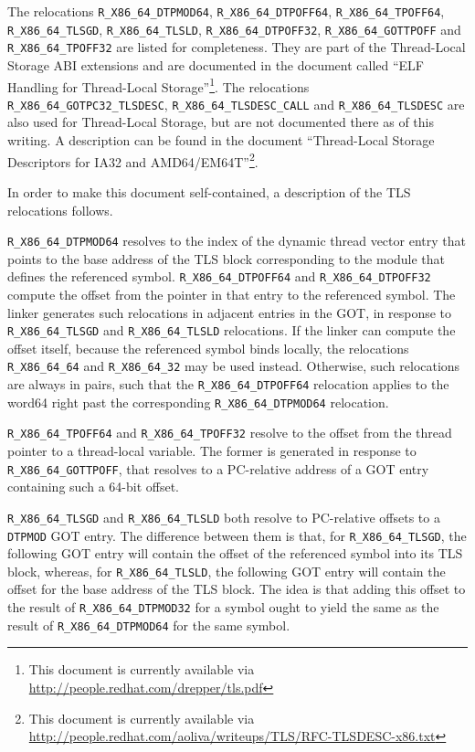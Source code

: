 \begin{sloppypar}
The relocations \texttt{R_X86_64_DTPMOD64},
\texttt{R_X86_64_DTPOFF64}, \texttt{R_X86_64_TPOFF64},
\texttt{R_X86_64_TLSGD}, \texttt{R_X86_64_TLSLD},
\texttt{R_X86_64_DTPOFF32}, \texttt{R_X86_64_GOTTPOFF} and
\texttt{R_X86_64_TPOFF32} are listed for completeness.  They are part
of the Thread-Local Storage ABI extensions and are documented in the
document called ``ELF Handling for Thread-Local
Storage''\footnote{This document is currently available via
  \url{http://people.redhat.com/drepper/tls.pdf}}.  The relocations \texttt{R_X86_64_GOTPC32_TLSDESC},
\texttt{R_X86_64_TLSDESC_CALL} and \texttt{R_X86_64_TLSDESC} are also
used for Thread-Local Storage, but are not documented there as of this
writing.  A description can be found in the document ``Thread-Local
Storage Descriptors for IA32 and AMD64/EM64T''\footnote{This document
  is currently available via
  \url{http://people.redhat.com/aoliva/writeups/TLS/RFC-TLSDESC-x86.txt}}.
\end{sloppypar}

In order to make this document self-contained, a description of the
TLS relocations follows.

\begin{sloppypar}
\texttt{R_X86_64_DTPMOD64} resolves to the index of the dynamic thread
vector entry that points to the base address of the TLS block
corresponding to the module that defines the referenced symbol.
\texttt{R_X86_64_DTPOFF64} and \texttt{R_X86_64_DTPOFF32} compute the
offset from the pointer in that entry to the referenced symbol.  The
linker generates such relocations in adjacent entries in the GOT, in
response to \texttt{R_X86_64_TLSGD} and \texttt{R_X86_64_TLSLD}
relocations.  If the linker can compute the offset itself, because the
referenced symbol binds locally, the relocations \texttt{R_X86_64_64} and \texttt{R_X86_64_32} may be used instead.
Otherwise, such relocations are always in pairs, such that the
\texttt{R_X86_64_DTPOFF64} relocation applies to the word64 right past the
corresponding \texttt{R_X86_64_DTPMOD64} relocation.
\end{sloppypar}

\texttt{R_X86_64_TPOFF64} and \texttt{R_X86_64_TPOFF32} resolve to the
offset from the thread pointer to a thread-local variable.  The former
is generated in response to \texttt{R_X86_64_GOTTPOFF}, that resolves
to a PC-relative address of a GOT entry containing such a 64-bit
offset.

\texttt{R_X86_64_TLSGD} and \texttt{R_X86_64_TLSLD} both resolve to
PC-relative offsets to a \texttt{DTPMOD} GOT entry.  The difference
between them is that, for \texttt{R_X86_64_TLSGD}, the following GOT entry will
contain the offset of the referenced symbol into its TLS block,
whereas, for \texttt{R_X86_64_TLSLD}, the following GOT entry will contain the
offset for the base address of the TLS block.  The idea is that adding
this offset to the result of \texttt{R_X86_64_DTPMOD32} for a symbol ought to
yield the same as the result of \texttt{R_X86_64_DTPMOD64} for the same symbol.

